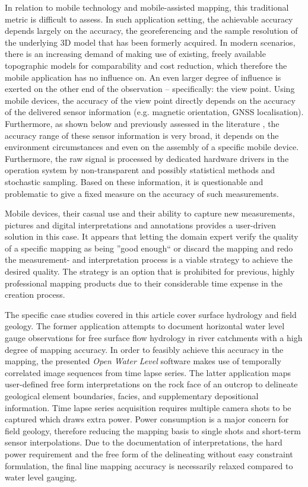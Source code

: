 \documentclass[review]{elsarticle}
\begin{document}
In relation to mobile technology and mobile-assisted mapping, this traditional metric is difficult to assess. In such application setting, the achievable accuracy depends largely on the accuracy, the georeferencing and the sample resolution of the underlying 3D model that has been formerly acquired. In modern scenarios, there is an increasing demand of making use of existing, freely available topographic models for comparability and cost reduction, which therefore the mobile application has no influence on. An even larger degree of influence is exerted on the other end of the observation -- specifically: the view point. Using mobile devices, the accuracy of the view point directly depends on the accuracy of the delivered sensor information (e.g. magnetic orientation, \gls{GNSS} localisation). Furthermore, as shown below and previously assessed in the literature \cite{Meek2012,Blum2013,Kehl2015c,Novakova2017},  the accuracy range of these sensor information is very broad, it depends on the environment circumstances and even on the assembly of a specific mobile device. Furthermore, the raw signal is processed by dedicated hardware drivers in the operation system by non-transparent and possibly statistical methods and stochastic sampling. Based on these information, it is questionable and problematic to give a fixed measure on the accuracy of such measurements.

Mobile devices, their casual use and their ability to capture new measurements, pictures and digital interpretations and annotations provides a user-driven solution in this case. It appears that letting the domain expert verify the quality of a specific mapping as being ''good enough`` or discard the mapping and redo the measurement- and interpretation process is a viable strategy to achieve the desired quality. The strategy is an option that is prohibited for previous, highly professional mapping products due to their considerable time expense in the creation process.

The specific case studies covered in this article cover surface hydrology and field geology. The former application attempts to document horizontal water level gauge observations for free surface flow hydrology in river catchments with a high degree of mapping accuracy. In order to feasibly achieve this accuracy in the mapping, the presented \textit{Open Water Level} software makes use of temporally correlated image sequences from time lapse series. The latter application maps user-defined free form interpretations on the rock face of an outcrop to delineate geological element boundaries, facies, and supplementary depositional information. Time lapse series acquisition requires multiple camera shots to be captured which draws extra power. Power consumption is a major concern for field geology, therefore reducing the mapping basis to single shots and short-term sensor interpolations. Due to the documentation of interpretations, the hard power requirement and the free form of the delineating without easy constraint formulation, the final line mapping accuracy is necessarily relaxed compared to water level gauging.
\end{document}

